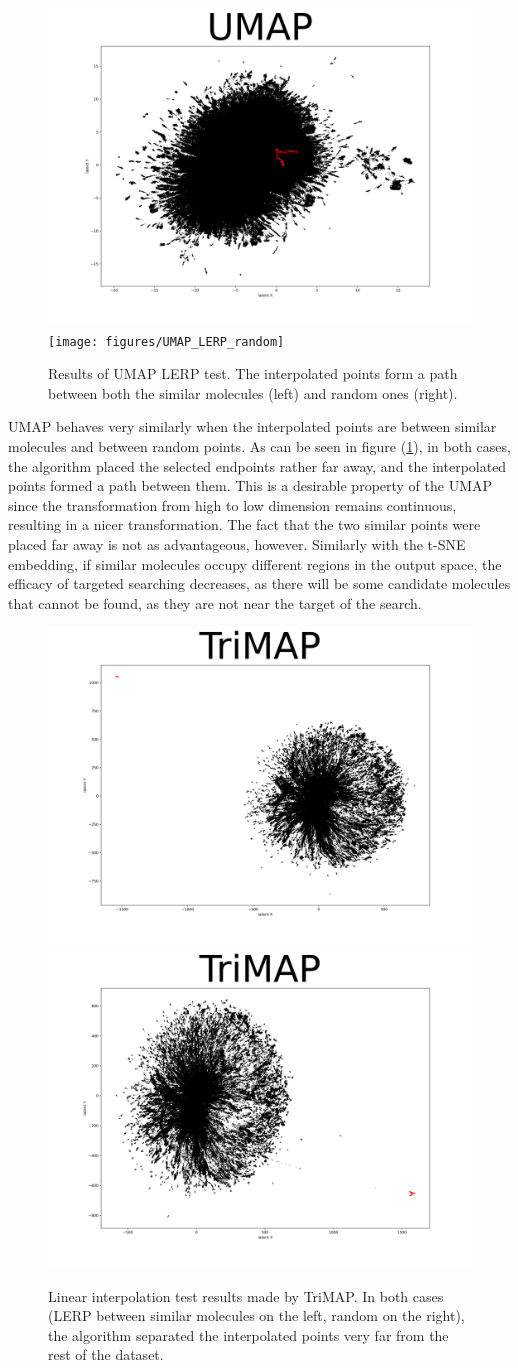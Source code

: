 \begin{figure}[h]
	\centering
	\includegraphics[width=0.49\columnwidth]{figures/UMAP_LERP_coxib}
	\texttt{[image: figures/UMAP\_LERP\_random]}
	\caption{Results of UMAP LERP test. The interpolated points form a path between both the similar molecules (left) and random ones (right).}
	\label{fig:umap:lerp}
\end{figure}

UMAP behaves very similarly when the interpolated points are between similar molecules and between random points. As can be seen in figure (\ref{fig:umap:lerp}), in both cases, the algorithm placed the selected endpoints rather far away, and the interpolated points formed a path between them. This is a desirable property of the UMAP since the transformation from high to low dimension remains continuous, resulting in a nicer transformation. The fact that the two similar points were placed far away is not as advantageous, however. Similarly with the t-SNE embedding, if similar molecules occupy different regions in the output space, the efficacy of targeted searching decreases, as there will be some candidate molecules that cannot be found, as they are not near the target of the search.

\begin{figure}[h]
	\centering
	\includegraphics[width=0.49\columnwidth]{figures/TriMAP_LERP_coxib}
	\includegraphics[width=0.49\columnwidth]{figures/TriMAP_LERP_random}
	\caption{Linear interpolation test results made by TriMAP. In both cases (LERP between similar molecules on the left, random on the right), the algorithm separated the interpolated points very far from the rest of the dataset.}
	\label{fig:trimap:lerp}
\end{figure}

